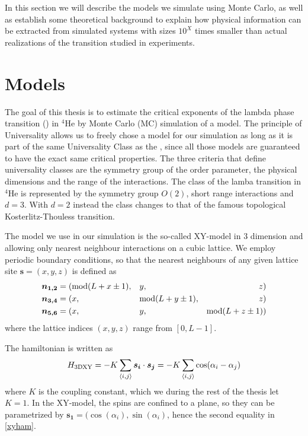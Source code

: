 %
In this section we will describe the models we simulate using Monte Carlo, as well as establish some theoretical background to explain how physical information can be extracted from simulated systems with sizes $10^X$ times smaller than actual realizations of the transition studied in experiments.
\section{Models} %
The goal of this thesis is to estimate the critical exponents of the lambda phase transition (\lpt) in $^4$He by Monte Carlo (MC) simulation of a model. 
The principle of Universality allows us to freely chose a model for our simulation as long as it is part of the same Universality Class as the \lpt, since all those models are guaranteed to have the exact same critical properties. 
The three criteria that define universality classes are the symmetry group of the order parameter, the physical dimensions and the range of the interactions.
The class of the lamba transition in $^4$He is represented by the symmetry group $O(2)$, short range interactions and $d=3$. With $d=2$ instead the class changes to that of the famous topological Kosterlitz-Thouless transition.

The model we use in our simulation is the so-called XY-model in 3 dimension and allowing only nearest neighbour interactions on a cubic lattice.
We employ periodic boundary conditions, so that the nearest neighbours of any given lattice site $\bm{s} = (x,y,z)$ is defined as 
\begin{align}
    \bm{n_{1,2}} &= (\textrm{mod}(L+x\pm1), &   &y,                    &    z)&\\
    \bm{n_{3,4}} &= (x,                  &   &\textrm{mod}(L+y\pm1),   &    z)&\\
    \bm{n_{5,6}} &= (x,                  &   &y,                    &    \textrm{mod}(L+z\pm1))&
\end{align}
where the lattice indices $(x,y,z)$ range from $[0,L-1]$.

The hamiltonian is written as 
\begin{equation}
  \label{xyham}
  H_{\textrm{3DXY}} = -K\sum\limits_{\langle i,j\rangle} \bm{s_i}\cdot\bm{s_j} = -K\sum\limits_{\langle i,j\rangle} \cos(\alpha_i - \alpha_j)
\end{equation}
where $K$ is the coupling constant, which we during the rest of the thesis let $K=1$.
In the XY-model, the spins are confined to a plane, so they can be parametrized by $ \bm{s_1} = (\cos(\alpha_i),\sin(\alpha_i)$, hence the second equality in \ref{xyham}.

